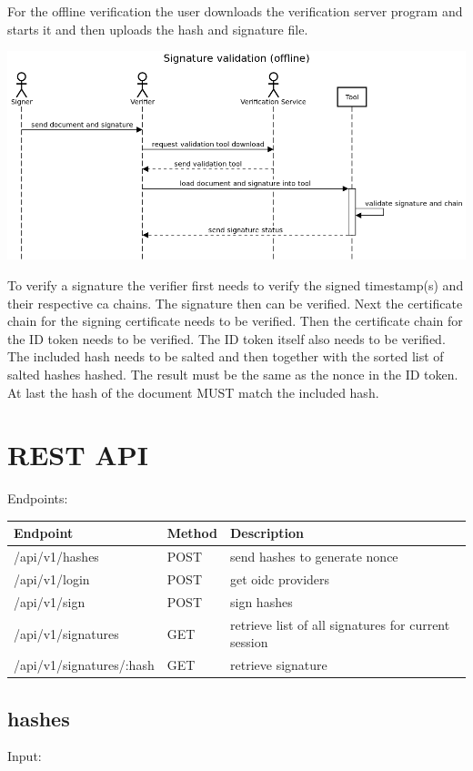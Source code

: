 For the offline verification the user downloads the verification server program and starts it and then uploads the hash and signature file.

\includegraphics[scale=0.5]{images/protocol_offline_verification_high_level.png}

To verify a signature the verifier first needs to verify the signed timestamp(s) and their respective ca chains.
The signature then can be verified.
Next the certificate chain for the signing certificate needs to be verified.
Then the certificate chain for the ID token needs to be verified.
The ID token itself also needs to be verified.
The included hash needs to be salted and then together with the sorted list of salted hashes hashed.
The result must be the same as the nonce in the ID token.
At last the hash of the document MUST match the included hash.

\section{REST API}
Endpoints:

\begin{tabular}{|l|l|l|}
	\hline
	Endpoint & Method & Description \\ \hline
	/api/v1/hashes & POST & send hashes to generate nonce \\ \hline
	/api/v1/login & POST & get oidc providers \\ \hline
	/api/v1/sign & POST & sign hashes \\ \hline
	/api/v1/signatures & GET & retrieve list of all signatures for current session \\ \hline
	/api/v1/signatures/:hash & GET & retrieve signature \\ \hline
\end{tabular}

\subsection{hashes}
Input:

